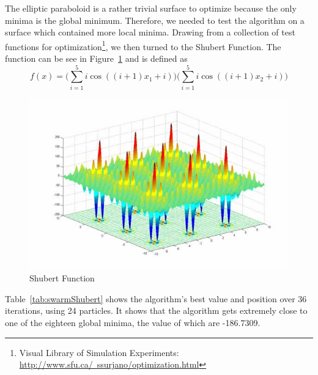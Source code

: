 \documentclass[oneside,12pt,openany]{book}
\begin{document}
    \FloatBarrier
    
    The elliptic paraboloid is a rather trivial surface to optimize because the only minima is the global minimum. Therefore, we needed to test the algorithm on a surface which contained more local minima. Drawing from a collection of test functions for optimization\footnote{Visual Library of Simulation Experiments: \href{http://www.sfu.ca/~ssurjano/optimization.html}{http://www.sfu.ca/~ssurjano/optimization.html}}, we then turned to the Shubert Function. The function can be see in Figure~\ref{fig:Shubert} and is defined as $$f(x)=\Bigg(\sum_{i=1}^{5} i\cos((i+1)x_{1}+i)\Bigg)\Bigg(\sum_{i=1}^{5} i\cos((i+1)x_{2}+i)\Bigg)$$
    
     \begin{figure}[hbt!]
        \centering
        \includegraphics[width=.8\linewidth]{images/Shubert.jpg}
        \caption{Shubert Function}
        \label{fig:Shubert}
    \end{figure}

    Table~\ref{tab:swarmShubert} shows the algorithm's best value and position over 36 iterations, using 24 particles. It shows that the algorithm gets extremely close to one of the eighteen global minima, the value of which are -186.7309.
    
    \FloatBarrier
\end{document}
